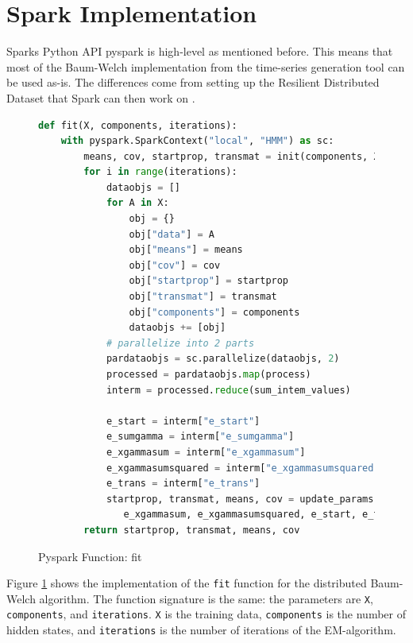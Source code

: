 \section{Spark Implementation}

Sparks Python API pyspark is high-level as mentioned before. This means that most of the Baum-Welch implementation from the time-series generation tool can be used as-is. The differences come from setting up the Resilient Distributed Dataset that Spark can then work on \parencite{sparkhmm}.

\begin{figure}
\begin{singlespace}
\begin{lstlisting}[language=Python]
def fit(X, components, iterations):
    with pyspark.SparkContext("local", "HMM") as sc:
        means, cov, startprop, transmat = init(components, X)
        for i in range(iterations):
            dataobjs = []
            for A in X:
                obj = {}
                obj["data"] = A
                obj["means"] = means
                obj["cov"] = cov
                obj["startprop"] = startprop
                obj["transmat"] = transmat
                obj["components"] = components
                dataobjs += [obj]
            # parallelize into 2 parts
            pardataobjs = sc.parallelize(dataobjs, 2)
            processed = pardataobjs.map(process)
            interm = processed.reduce(sum_intem_values)

            e_start = interm["e_start"]
            e_sumgamma = interm["e_sumgamma"]
            e_xgammasum = interm["e_xgammasum"]
            e_xgammasumsquared = interm["e_xgammasumsquared"]
            e_trans = interm["e_trans"]
            startprop, transmat, means, cov = update_params(e_sumgamma, \
               e_xgammasum, e_xgammasumsquared, e_start, e_trans)
        return startprop, transmat, means, cov
\end{lstlisting}
\end{singlespace}
\caption{Pyspark Function: fit}    
\label{fig:pyspark-fit-listing}
\end{figure}

Figure \ref{fig:pyspark-fit-listing} shows the implementation of the \texttt{fit} function for the distributed Baum-Welch algorithm. The function signature is the same: the parameters are \texttt{X}, \texttt{components}, and \texttt{iterations}. \texttt{X} is the training data, \texttt{components} is the number of hidden states, and \texttt{iterations} is the number of iterations of the EM-algorithm. 


